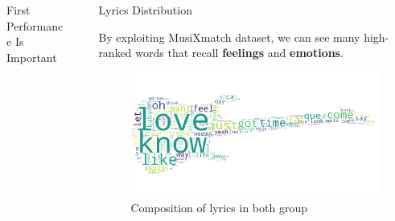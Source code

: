 \documentclass[final]{beamer}
\newlength{\sepwid}
\newlength{\onecolwid}
\newlength{\twocolwid}
\begin{document}
\begin{frame}
\begin{columns}[t]
\begin{column}{\twocolwid}
\begin{columns}[t,totalwidth=\twocolwid]
\begin{column}{\onecolwid}
\begin{exampleblock}{First Performance Is Important}

\end{exampleblock}


\end{column} %

\end{columns} %

\end{column} %

\begin{column}{\sepwid}\end{column} %

\begin{column}{\onecolwid} %


\begin{exampleblock}{Lyrics Distribution}

By exploiting MusiXmatch dataset, we can see many high-ranked words that recall \textbf{feelings} and \textbf{emotions}.

\begin{figure}
\includegraphics[width=0.9\linewidth]{img/wc3.png}
\caption{Composition of lyrics in both group}
\end{figure}
\end{exampleblock}


\end{column}
\end{columns}
\end{frame}
\end{document}
